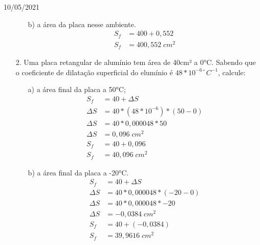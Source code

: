 \documentclass{SchoolBook}
\begin{document}
\begin{day}{10/05/2021}
\begin{enumerate}
\begin{enumerate}
                \item[b)] a área da placa nesse ambiente.
                \begin{align*}
                    S_f &= 400 + 0,552   \\
                    S_f &= 400,552\;cm^2
                \end{align*}    
            \end{enumerate}
            
            \item[2.] Uma placa retangular de alumínio tem área de 40cm² a 0°C. Sabendo que o coeficiente de dilatação superficial do elumínio é $48 * 10^{-6\circ}C^{-1}$, calcule:
            
            \begin{enumerate}
                \item[a)] a área final da placa a 50°C;
                \begin{align*}
                         S_f &= 40 + \Delta S                \\[3pt]
                    \Delta S &= 40 * (48*10^{-6}) * (50 - 0) \\
                    \Delta S &= 40 * 0,000048 * 50           \\
                    \Delta S &= 0,096\;cm^2                  \\[3pt]
                         S_f &= 40 + 0,096                   \\
                         S_f &= 40,096\;cm^2
                \end{align*}
                
                \item[b)] a área final da placa a -20°C.
                \begin{align*}
                         S_f &= 40 + \Delta S             \\[3pt]
                    \Delta S &= 40 * 0,000048 * (-20 - 0) \\
                    \Delta S &= 40 * 0,000048 * -20       \\
                    \Delta S &= -0,0384\;cm^2             \\[3pt]
                         S_f &= 40 + (-0,0384)            \\
                         S_f &= 39,9616\;cm^2
                \end{align*}
            \end{enumerate}
        \end{enumerate}
    \end{day}
    
\end{document}

